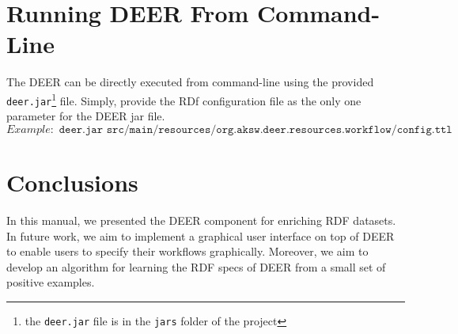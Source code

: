 \documentclass[a4paper,twoside,bibtotoc,abstracton,12pt,BCOR=15mm]{article}
\newcommand{\geolift}{\textsc{DEER}\xspace}
\begin{document}
\section{Running \geolift From Command-Line }

The \geolift can be directly executed from command-line using the provided \texttt{deer.jar}\footnote{the \texttt{deer.jar} file is in the \texttt{jars} folder of the project} file.
Simply, provide the RDf configuration file as the only one parameter for the \geolift jar file.
\begin{equation*}
  Example: \texttt{ deer.jar src/main/resources/org.aksw.deer.resources.workflow/config.ttl }
\end{equation*}

\section{Conclusions}
In this manual, we presented the \geolift component for enriching RDF datasets.
In future work, we aim to implement a graphical user interface on top of \geolift to enable users to specify their workflows graphically.
Moreover, we aim to develop an algorithm for learning the RDF specs of \geolift from a small set of positive examples.



\end{document}
